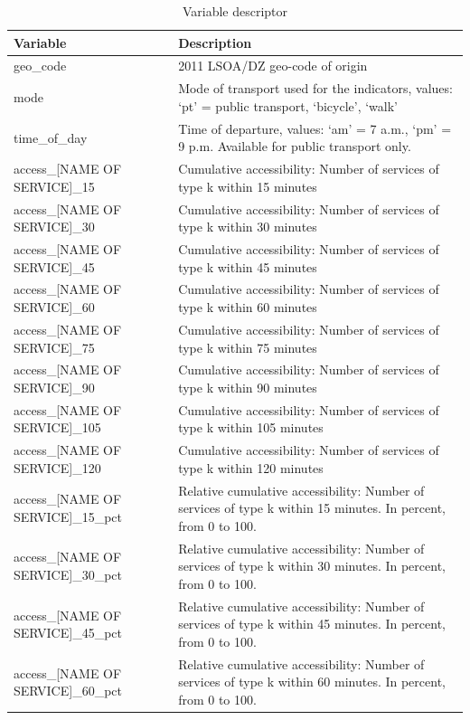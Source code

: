 \documentclass{article}
\begin{document}
\begin{table}[!h]

\caption{\label{tab:unnamed-chunk-5}Variable descriptor}
\centering
\begin{tabu} to 
\toprule
Variable & Description\\
\midrule
geo\_code & 2011 LSOA/DZ geo-code of origin\\
mode & Mode of transport used for the indicators, values: `pt' = public transport, `bicycle', `walk'\\
time\_of\_day & Time of departure, values: `am' = 7 a.m., `pm' = 9 p.m. Available for public transport only.\\
access\_[NAME OF SERVICE]\_15 & Cumulative accessibility: Number of services of type k within 15 minutes\\
access\_[NAME OF SERVICE]\_30 & Cumulative accessibility: Number of services of type k within 30 minutes\\
\addlinespace
access\_[NAME OF SERVICE]\_45 & Cumulative accessibility: Number of services of type k within 45 minutes\\
access\_[NAME OF SERVICE]\_60 & Cumulative accessibility: Number of services of type k within 60 minutes\\
access\_[NAME OF SERVICE]\_75 & Cumulative accessibility: Number of services of type k within 75 minutes\\
access\_[NAME OF SERVICE]\_90 & Cumulative accessibility: Number of services of type k within 90 minutes\\
access\_[NAME OF SERVICE]\_105 & Cumulative accessibility: Number of services of type k within 105 minutes\\
\addlinespace
access\_[NAME OF SERVICE]\_120 & Cumulative accessibility: Number of services of type k within 120 minutes\\
access\_[NAME OF SERVICE]\_15\_pct & Relative cumulative accessibility: Number of services of type k within 15 minutes. In percent, from 0 to 100.\\
access\_[NAME OF SERVICE]\_30\_pct & Relative cumulative accessibility: Number of services of type k within 30 minutes. In percent, from 0 to 100.\\
access\_[NAME OF SERVICE]\_45\_pct & Relative cumulative accessibility: Number of services of type k within 45 minutes. In percent, from 0 to 100.\\
access\_[NAME OF SERVICE]\_60\_pct & Relative cumulative accessibility: Number of services of type k within 60 minutes. In percent, from 0 to 100.\\

\end{tabu}
\end{table}
\end{document}
